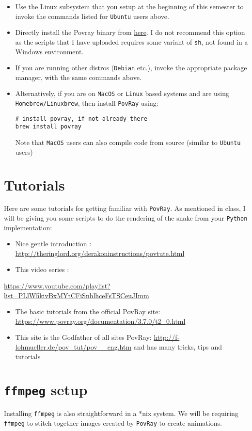 \documentclass[11pt]{article}
\begin{document}
\begin{itemize}
\item Use the Linux subsystem that you setup at the beginning of this semester to
invoke the commands listed for \texttt{Ubuntu} users above.
\item Directly install the Povray binary from \href{http://www.povray.org/download/}{here}. I do not recommend this option
as the scripts that I have uploaded requires some variant of \texttt{sh}, not found
in a Windows environment.

\item If you are running other distros (\texttt{Debian} etc.), invoke the appropriate package
manager, with the same commands above.
\item Alternatively, if you are on \texttt{MacOS} or \texttt{Linux} based systems and are using
\texttt{Homebrew/Linuxbrew}, then install \texttt{PovRay} using:
\begin{verbatim}
# install povray, if not already there
brew install povray
\end{verbatim}
Note that \texttt{MacOS} users can also compile code from source (similar to \texttt{Ubuntu} users)
\end{itemize}

\section{Tutorials}
\label{sec:org4a88848}
Here are some tutorials for getting familiar with \texttt{PovRay}. As mentioned in
class, I will be giving you some scripts to do the rendering of the snake from
your \texttt{Python} implementation:
\begin{itemize}
\item Nice gentle introduction : \url{http://theringlord.org/derakoninstructions/povtute.html}
\item This video series :
\end{itemize}
\url{https://www.youtube.com/playlist?list=PLlW5kivBxMYtCFiSnhlhceFsTSCeuJImm}
\begin{itemize}
\item The basic tutorials from the official PovRay site: \url{https://www.povray.org/documentation/3.7.0/t2\_0.html}
\item This site is the Godfather of all sites PovRay:
\url{http://f-lohmueller.de/pov\_tut/pov\_\_eng.htm} and has many tricks, tips and tutorials
\end{itemize}
\section{\texttt{ffmpeg} setup}
\label{sec:orgd716b74}
Installing \texttt{ffmpeg} is also straightforward in a *nix system. We will be
requiring \texttt{ffmpeg} to stitch together images created by \texttt{PovRay} to create
animations.
\end{document}
